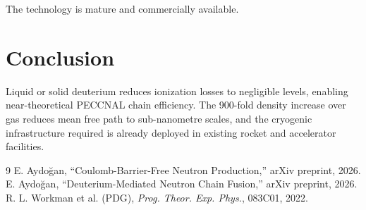 \documentclass[12pt,a4paper]{article}
\begin{document}
The technology is mature and commercially available.

\section{Conclusion}
Liquid or solid deuterium reduces ionization losses to negligible
levels, enabling near-theoretical PECCNAL chain efficiency.
The 900-fold density increase over gas reduces mean free path to
sub-nanometre scales, and the cryogenic infrastructure required
is already deployed in existing rocket and accelerator facilities.

\begin{thebibliography}{9}
 E. Aydoğan, ``Coulomb-Barrier-Free Neutron Production,'' arXiv preprint, 2026.
 E. Aydoğan, ``Deuterium-Mediated Neutron Chain Fusion,'' arXiv preprint, 2026.
 R. L. Workman et al. (PDG), \textit{Prog. Theor. Exp. Phys.}, 083C01, 2022.
\end{thebibliography}
\end{document}
